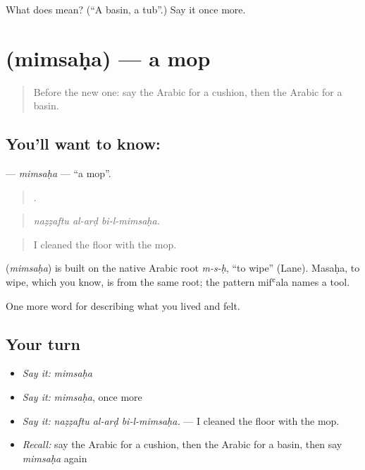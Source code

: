 \begin{tcolorbox}[breakable,colback=teal!4,colframe=teal!35!black,title={Before you move on}]
What does  mean? (\textquotedblleft{}A basin, a tub\textquotedblright{}.) Say it once more.
\end{tcolorbox}
\section[\texorpdfstring{\ar{ممسحة} (mimsaḥa)}{ممسحة (mimsaḥa)}]{ (mimsaḥa) — a mop}

\label{lesson:AR-C551-mimsaha}



\begin{quote}
Before the new one: say the Arabic for a cushion, then the Arabic for a basin.
\end{quote}

\subsection*{You'll want to know: }
\textbf{} — \emph{mimsaḥa} — \textquotedblleft{}a mop\textquotedblright{}.

\begin{quote}
  .
\end{quote}

\begin{quote}
\emph{naẓẓaftu al-arḍ bi-l-mimsaḥa.}
\end{quote}

\begin{quote}
I cleaned the floor with the mop.
\end{quote}

\begin{cousinweb}
\textbf{} (\emph{mimsaḥa}) is built on the native Arabic root \emph{m-s-ḥ}, \textquotedblleft{}to wipe\textquotedblright{} (Lane). Masaḥa, to wipe, which you know, is from the same root; the pattern mifʿala names a tool.
\end{cousinweb}

\begin{grammarlens}[title={What you've built}]
One more word for describing what you lived and felt.
\end{grammarlens}

\subsection*{Your turn}
\begin{itemize}
\raggedright
  \item \emph{Say it:} \emph{mimsaḥa}
  \item \emph{Say it:} \emph{mimsaḥa}, once more
  \item \emph{Say it:} \emph{naẓẓaftu al-arḍ bi-l-mimsaḥa.} — I cleaned the floor with the mop.
  \item \emph{Recall:} say the Arabic for a cushion, then the Arabic for a basin, then say \emph{mimsaḥa} again
\end{itemize}

